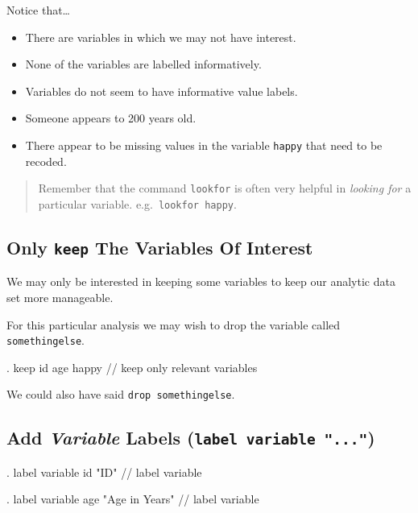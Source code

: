 \documentclass[
]{article}
\providecommand{\tightlist}{%
  \setlength{\itemsep}{0pt}\setlength{\parskip}{0pt}}
\begin{document}
Notice that\ldots{}

\begin{itemize}
\tightlist
\item
  There are variables in which we may not have interest.
\item
  None of the variables are labelled informatively.
\item
  Variables do not seem to have informative value labels.
\item
  Someone appears to 200 years old.
\item
  There appear to be missing values in the variable \texttt{happy} that
  need to be recoded.
\end{itemize}

\begin{quote}
Remember that the command \texttt{lookfor} is often very helpful in
\emph{looking for} a particular variable. e.g.~\texttt{lookfor\ happy}.
\end{quote}

\subsection{\texorpdfstring{Only \texttt{keep} The Variables Of
Interest}{Only keep The Variables Of Interest}}\label{only-keep-the-variables-of-interest}

We may only be interested in keeping some variables to keep our analytic
data set more manageable.

For this particular analysis we may wish to drop the variable called
\texttt{somethingelse}.

\begin{stlog}
. keep id age happy // keep only relevant variables
\end{stlog}

We could also have said \texttt{drop\ somethingelse}.

\subsection{\texorpdfstring{Add \emph{Variable} Labels
(\texttt{label\ variable\ "..."})}{Add Variable Labels (label variable "...")}}\label{add-variable-labels-label-variable-...}

\begin{stlog}
. label variable id "ID" // label variable
\end{stlog}

\begin{stlog}
. label variable age "Age in Years" // label variable
\end{stlog}
\end{document}
